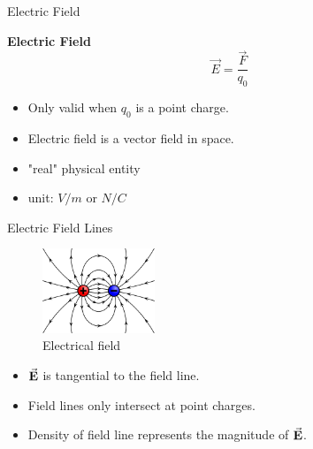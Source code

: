 \documentclass{beamer}
\begin{document}
\begin{frame}{Electric Field}	
	\begin{beamerboxesrounded}[shadow=true]{\bf Electric Field}
        \begin{equation}
			\vec{E} = \frac{\vec{F}}{q_0}
		\end{equation}
    \end{beamerboxesrounded}
	
	\begin{itemize}
		\item Only valid when $q_0$ is a point charge.
		\item Electric field is a vector field in space.
		\item "real" physical entity
		\item unit: $V/m$ or $N/C$
	\end{itemize}
\end{frame}

\begin{frame}{Electric Field Lines}
	\begin{figure}[htbp]
		\centering
		\includegraphics[width=0.3\textwidth]{Images/ele_field.png}
		\caption{Electrical field}
	\end{figure}

	\begin{itemize}
		\item $\va{E}$ is tangential to the field line.
		\item Field lines only intersect at point charges.
		\item Density of field line represents the magnitude of $\va{E}$.
	\end{itemize}
\end{frame}
\end{document}
